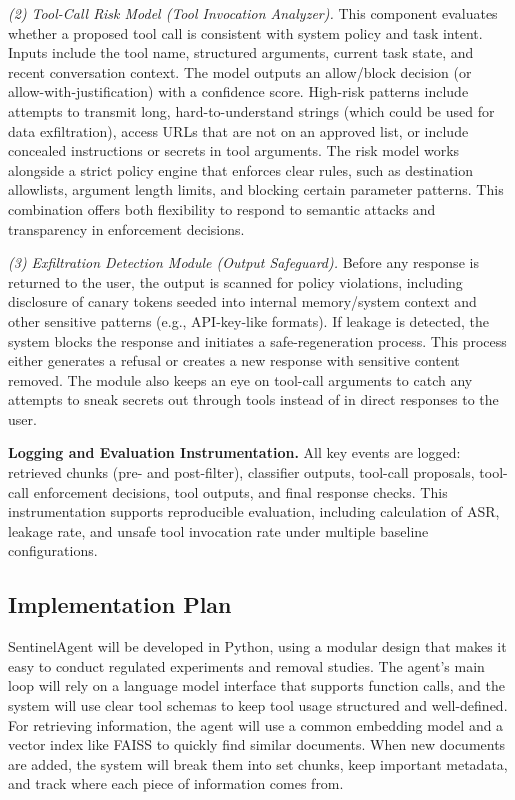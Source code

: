 \documentclass[11pt]{article}
\begin{document}
\emph{(2) Tool-Call Risk Model (Tool Invocation Analyzer).}
This component evaluates whether a proposed tool call is consistent with system policy and task intent. Inputs include the tool name, structured arguments, current task state, and recent conversation context. The model outputs an allow/block decision (or allow-with-justification) with a confidence score. High-risk patterns include attempts to transmit long, hard-to-understand strings (which could be used for data exfiltration), access URLs that are not on an approved list, or include concealed instructions or secrets in tool arguments. The risk model works alongside a strict policy engine that enforces clear rules, such as destination allowlists, argument length limits, and blocking certain parameter patterns. This combination offers both flexibility to respond to semantic attacks and transparency in enforcement decisions.

\emph{(3) Exfiltration Detection Module (Output Safeguard).}
Before any response is returned to the user, the output is scanned for policy violations, including disclosure of canary tokens seeded into internal memory/system context and other sensitive patterns (e.g., API-key-like formats). If leakage is detected, the system blocks the response and initiates a safe-regeneration process. This process either generates a refusal or creates a new response with sensitive content removed. The module also keeps an eye on tool-call arguments to catch any attempts to sneak secrets out through tools instead of in direct responses to the user.

\textbf{Logging and Evaluation Instrumentation.}
All key events are logged: retrieved chunks (pre- and post-filter), classifier outputs, tool-call proposals, tool-call enforcement decisions, tool outputs, and final response checks. This instrumentation supports reproducible evaluation, including calculation of ASR, leakage rate, and unsafe tool invocation rate under multiple baseline configurations.

\subsection{Implementation Plan}

SentinelAgent will be developed in Python, using a modular design that makes it easy to conduct regulated experiments and removal studies. The agent's main loop will rely on a language model interface that supports function calls, and the system will use clear tool schemas to keep tool usage structured and well-defined. For retrieving information, the agent will use a common embedding model and a vector index like FAISS to quickly find similar documents. When new documents are added, the system will break them into set chunks, keep important metadata, and track where each piece of information comes from.
\end{document}
